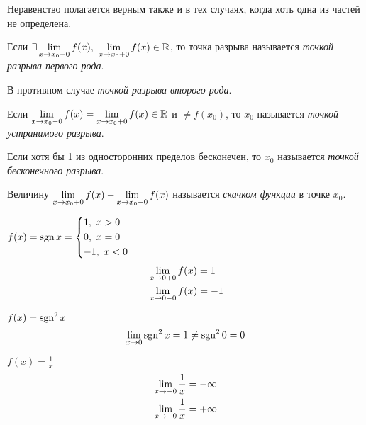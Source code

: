\begin{note}
	Неравенство полагается верным также и в тех случаях, когда хоть одна из частей не определена.
\end{note}

\begin{definition}
	Если $\exists \liml_{x \to x_0-0} f(x),\ \liml_{x \to x_0+0} f(x) \in \R$, то точка разрыва называется \textit{точкой разрыва первого рода}.
	
	В противном случае \textit{точкой разрыва второго рода}.
\end{definition}

\begin{definition}
	Если $\lim\limits_{x \to x_0-0} f(x) = \lim\limits_{x \to x_0+0} f(x) \in \mathbb{R}$ и $\neq f(x_0)$, то $x_0$ называется \textit{точкой устранимого разрыва}.
\end{definition}

\begin{definition}
	Если хотя бы 1 из односторонних пределов бесконечен, то $x_0$ называется \textit{точкой бесконечного разрыва}.
\end{definition}

\begin{definition}
	Величину $\lim\limits_{x \to x_0+0} f(x) - \lim\limits_{x \to x_0-0} f(x)$ называется \textit{скачком функции} в точке $x_0$.
\end{definition}

\begin{example}
	$f(x) = \operatorname{sgn} x = \left\{\begin{aligned}&{1,\ x > 0} \\ &{0,\ x = 0} \\ &{-1,\ x < 0}\end{aligned}\right.$
	\begin{align*}
		&\lim\limits_{x \to 0 + 0} f(x) = 1
		\\
		&\lim\limits_{x \to 0 - 0} f(x) = -1
	\end{align*}
\end{example}

\begin{example}
	$f(x) = \operatorname{sgn}^2 x$
	$$
		\lim\limits_{x \to 0} \operatorname{sgn}^2 x = 1 \neq \operatorname{sgn}^2 0 = 0
	$$
\end{example}

\begin{example}
	$f(x) = \frac{1}{x}$
	\begin{align*}
		\lim\limits_{x \to -0} \frac{\displaystyle 1}{\displaystyle x} = -\infty
		\\
		\lim\limits_{x \to +0} \frac{\displaystyle 1}{\displaystyle x} = +\infty
	\end{align*}
\end{example}

